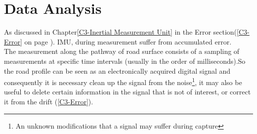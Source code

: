 \documentclass{standalone}
\begin{document}
\chapter{Data Analysis}
\label{Data Analysis}
As discussed in Chapter\ref{C3-Inertial Measurement Unit} in the Error section(\ref{C3-Error} on page \pageref{C3-Error}). IMU, during measurement suffer from accumulated error.\pageref{C3-Error}\\
The measurement along the pathway of road surface consists of a sampling of measurements at specific time intervals (usually in the order of milliseconds).So the road profile can be seen as an electronically acquired digital signal and consequently it is necessary clean up the signal from the noise\footnote{An unknown modifications that a signal may suffer during capture}, it may also be useful to delete certain information in the signal that is not of interest, or correct it from the drift (\ref{C3-Error}).\\
\end{document}

